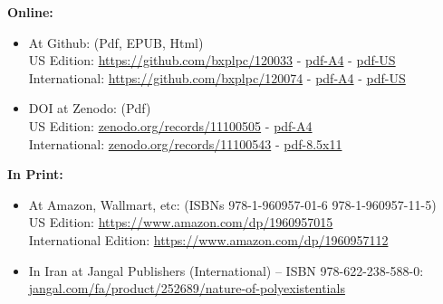\begin{whenOrg}
\begin{frame}[fragile,plain,label=obtainingPolyBook]
\begin{latexonly}
    \begin{center}
          \colorbox{blue!30}{\color{black} \textbf{Online:}}
    \end{center}
\end{latexonly}

    \addtolength{\leftmargini}{\labelsep}

    \begin{itemize}
      \item At Github: (Pdf, EPUB, Html) \\
      US Edition:   \url{https://github.com/bxplpc/120033} - \href{https://github.com/bxplpc/120033/blob/main/pdf/c-120033-1_05-book-a4-col-emb-pub.pdf}{pdf-A4} -
      \href{https://github.com/bxplpc/120033/blob/main/pdf/c-120033-1_05-book-8.5x11-col-emb-pub.pdf}{pdf-US}\\
      International: \url{https://github.com/bxplpc/120074} - \href{https://github.com/bxplpc/120074/blob/main/pdf/c-120074-1_05-book-a4-col-emb-pub.pdf}{pdf-A4} -   \href{https://github.com/bxplpc/120074/blob/main/pdf/c-120074-1_05-book-8.5x11-col-emb-pub.pdf}{pdf-US}\\
      \item DOI at Zenodo: (Pdf)\\
      US Edition:   \href{https://zenodo.org/records/11100505}{zenodo.org/records/11100505}  -   \href{https://zenodo.org/records/11100527}{pdf-A4}\\
      International: \href{https://zenodo.org/records/11100543}{zenodo.org/records/11100543}  -   \href{https://zenodo.org/records/11100551}{pdf-8.5x11}\\
    \end{itemize}

    \begin{center}
      \colorbox{blue!60}{\color{white} \textbf{In Print:}}
    \end{center}

    \begin{itemize}
      \item At Amazon, Wallmart, etc: (ISBNs 978-1-960957-01-6  978-1-960957-11-5)\\
      US Edition:   \url{https://www.amazon.com/dp/1960957015}\\
      International Edition: \url{https://www.amazon.com/dp/1960957112}\\
      \item In Iran at Jangal Publishers (International) -- ISBN 978-622-238-588-0:\\
      \href{https://jangal.com/fa/product/252689/nature-of-polyexistentials}{jangal.com/fa/product/252689/nature-of-polyexistentials}
    \end{itemize}


\end{frame}
\end{whenOrg}
